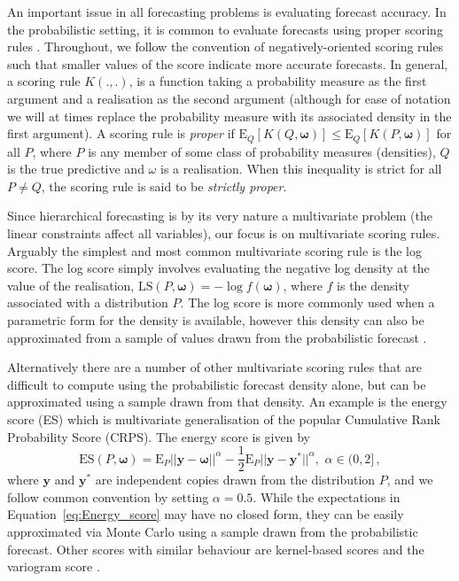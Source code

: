\documentclass[12pt]{article}
\def\E{\text{E}}
\theoremstyle{definition}
\begin{document}
An important issue in all forecasting problems is evaluating forecast accuracy. In the probabilistic setting, it is common to evaluate forecasts using proper scoring rules \citep[see][and references therein]{Gneiting2007,Gneiting2014}. Throughout, we follow the convention of negatively-oriented scoring rules such that smaller values of the score indicate more accurate forecasts.  In general, a scoring rule $K(.,.)$, is a function taking a probability measure as the first argument and a realisation as the second argument (although for ease of notation we will at times replace the probability measure with its associated density in the first argument). A scoring rule is {\em proper} if $\E_{Q}[K(Q,\bm{\omega})] \le \E_{Q}[K(P,{\bm\omega})]$ for all $P$, where $P$ is any member of some class of probability measures (densities), $Q$ is the true predictive and $\omega$ is a realisation. When this inequality is strict for all $P\neq Q$, the scoring rule is said to be {\em strictly proper}.

Since hierarchical forecasting is by its very nature a multivariate problem (the linear constraints affect all variables), our focus is on multivariate scoring rules.  Arguably the simplest and most common multivariate scoring rule is the log score. The log score simply involves evaluating the negative log density at the value of the realisation, $\text{LS}(P,\bm\omega)=-\log f(\bm\omega)$, where $f$ is the density associated with a distribution $P$.  The log score is more commonly used when a parametric form for the density is available, however  this density can also be approximated from a sample of values drawn from the probabilistic forecast \citep[see][]{Jordan2017}.

Alternatively there are a number of other multivariate scoring rules that are difficult to compute using the probabilistic forecast density alone, but can be approximated using a sample drawn from that density.  An example is the energy score (ES) \citep[see][for details]{szekely2003,Gneiting2007} which is multivariate generalisation of the popular Cumulative Rank Probability Score (CRPS).  The energy score is given by
\begin{equation}\label{eq:Energy_score}
\text{ES}(P,\bm{\omega}) =
\E_{P}
||{\bm{y}}-\bm{\omega}||^\alpha -\frac{1}{2}\E_{P}||\bm{y}-\bm{y}^*||^\alpha, \,\, \alpha \in (0,2]\,,
\end{equation}
where $\bm {y}$ and $\bm{y^*}$ are independent copies drawn from the distribution $P$, and we follow common convention by setting $\alpha=0.5$.  While the expectations in Equation~\ref{eq:Energy_score} may have no closed form, they can be easily approximated via Monte Carlo using a sample drawn from the probabilistic forecast.  Other scores with similar behaviour are kernel-based scores \citep{dawid2007,Gneiting2007} and the variogram score \citep{SCHEUERER2015}.
\end{document}
